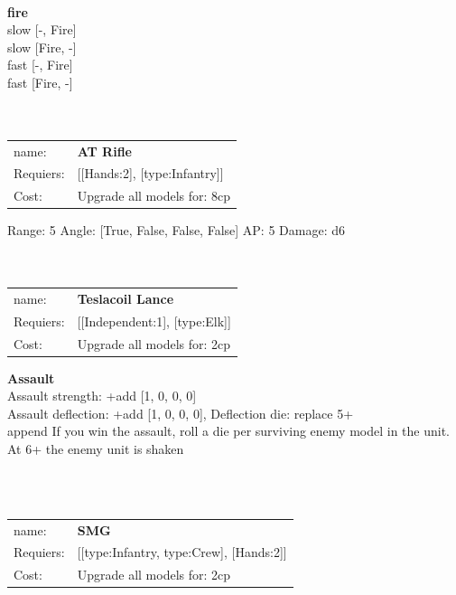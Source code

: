 \ \\ {\bf fire } \\
slow [-, Fire] \\
slow [Fire, -] \\
fast [-, Fire] \\
fast [Fire, -] \\

\ \\
\ \\
\begin{tabular}{ll}
name: & {\bf AT Rifle } \\
Requiers: & [[Hands:2], [type:Infantry]] \\
Cost: & Upgrade all models for: 8cp \\
\end{tabular}



Range: 5  Angle: [True, False, False, False] AP: 5 Damage: d6 \\








\ \\
\ \\
\begin{tabular}{ll}
name: & {\bf Teslacoil Lance } \\
Requiers: & [[Independent:1], [type:Elk]] \\
Cost: & Upgrade all models for: 2cp \\
\end{tabular}





{\bf Assault} \ \\
Assault strength: +add [1, 0, 0, 0] 
\\ 
Assault deflection: +add [1, 0, 0, 0], Deflection die: replace 5+
\\ 

append If you win the assault, roll a die per surviving enemy model in the unit. At 6+ the enemy unit is shaken


\ \\
\ \\
\begin{tabular}{ll}
name: & {\bf SMG } \\
Requiers: & [[type:Infantry, type:Crew], [Hands:2]] \\
Cost: & Upgrade all models for: 2cp \\
\end{tabular}



